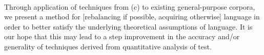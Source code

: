 \paragraph{}
Through application of techniques from (c) to existing general-purpose corpora, we present a method for [rebalancing if possible, acquiring otherwise] language in order to better satisfy the underlying theoretical assumptions of language.  It is our hope that this may lead to a step improvement in the accuracy and/or generality of techniques derived from quantitative analysis of test.


